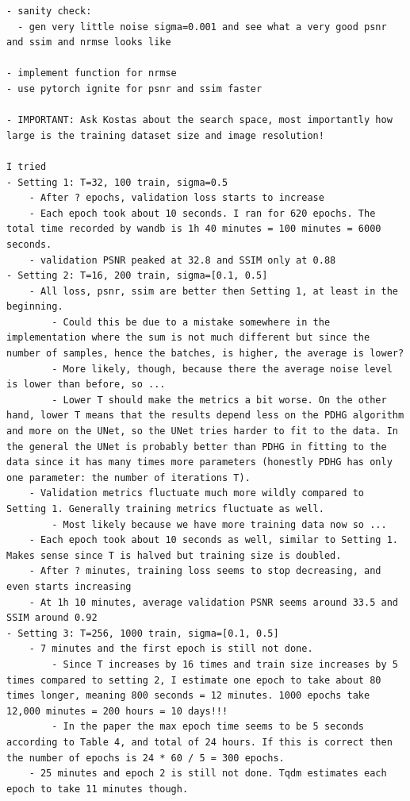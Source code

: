 \documentclass[12pt]{article}
\begin{document}
\begin{verbatim}
- sanity check:
  - gen very little noise sigma=0.001 and see what a very good psnr and ssim and nrmse looks like

- implement function for nrmse
- use pytorch ignite for psnr and ssim faster

- IMPORTANT: Ask Kostas about the search space, most importantly how large is the training dataset size and image resolution!

I tried
- Setting 1: T=32, 100 train, sigma=0.5
    - After ? epochs, validation loss starts to increase
    - Each epoch took about 10 seconds. I ran for 620 epochs. The total time recorded by wandb is 1h 40 minutes = 100 minutes = 6000 seconds.
    - validation PSNR peaked at 32.8 and SSIM only at 0.88 
- Setting 2: T=16, 200 train, sigma=[0.1, 0.5]
    - All loss, psnr, ssim are better then Setting 1, at least in the beginning.
        - Could this be due to a mistake somewhere in the implementation where the sum is not much different but since the number of samples, hence the batches, is higher, the average is lower?
        - More likely, though, because there the average noise level is lower than before, so ...
        - Lower T should make the metrics a bit worse. On the other hand, lower T means that the results depend less on the PDHG algorithm and more on the UNet, so the UNet tries harder to fit to the data. In the general the UNet is probably better than PDHG in fitting to the data since it has many times more parameters (honestly PDHG has only one parameter: the number of iterations T).
    - Validation metrics fluctuate much more wildly compared to Setting 1. Generally training metrics fluctuate as well.
        - Most likely because we have more training data now so ...
    - Each epoch took about 10 seconds as well, similar to Setting 1. Makes sense since T is halved but training size is doubled.
    - After ? minutes, training loss seems to stop decreasing, and even starts increasing
    - At 1h 10 minutes, average validation PSNR seems around 33.5 and SSIM around 0.92
- Setting 3: T=256, 1000 train, sigma=[0.1, 0.5]
    - 7 minutes and the first epoch is still not done.
        - Since T increases by 16 times and train size increases by 5 times compared to setting 2, I estimate one epoch to take about 80 times longer, meaning 800 seconds = 12 minutes. 1000 epochs take 12,000 minutes = 200 hours = 10 days!!!
        - In the paper the max epoch time seems to be 5 seconds according to Table 4, and total of 24 hours. If this is correct then the number of epochs is 24 * 60 / 5 = 300 epochs.
    - 25 minutes and epoch 2 is still not done. Tqdm estimates each epoch to take 11 minutes though.

\end{verbatim}
\end{document}
